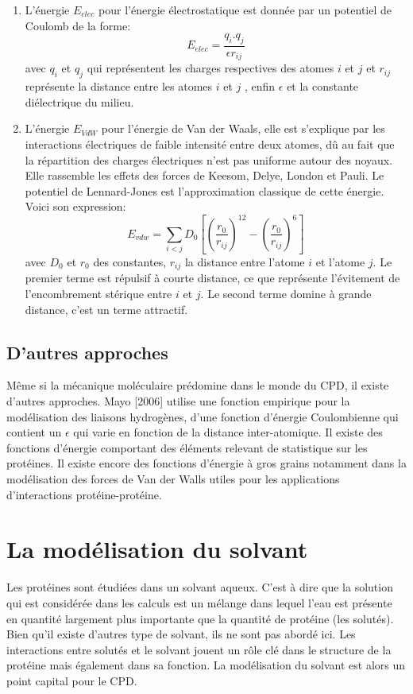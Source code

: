 \begin{enumerate}
  \label{VdW}
\item L'énergie $E_{elec}$ pour l'énergie électrostatique est donnée par un potentiel de Coulomb de la forme:
  \begin{equation}
    E_{elec}=\frac{q_i.q_j}{\epsilon r_{ij}}
  \end{equation}
  avec $q_i$ et $q_j$ qui représentent les charges respectives des atomes $i$ et $j$ et $r_{ij}$ représente la distance entre les atomes $i$ et $j$ , enfin $\epsilon$ et la constante diélectrique du milieu.
\item L'énergie  $E_{VdW}$ pour l'énergie de Van der Waals, elle est s'explique par les interactions électriques de faible intensité entre deux atomes, dû au fait que la répartition des charges électriques n'est pas uniforme autour des noyaux. Elle rassemble les effets des forces de Keesom, Delye, London et Pauli. Le potentiel de Lennard-Jones est l'approximation classique de cette énergie. Voici son expression:
  \begin{equation}
  E_{vdw} = \sum_{i<j}D_0 [(\frac{r_0}{r_{ij}})^12 - (\frac{r_0}{r_{ij}})^6]  
  \end{equation}
avec $D_0$ et $r_0$ des constantes, $r_{ij}$ la distance entre l'atome $i$ et l'atome $j$. Le premier terme est répulsif à courte distance, ce que représente l'évitement de l'encombrement stérique entre $i$ et $j$. Le second terme domine à grande distance, c'est un terme attractif. 
  
\end{enumerate}


\subsection{D'autres approches}

Même si la mécanique moléculaire prédomine dans le monde du CPD, il existe d'autres approches. Mayo [2006] utilise une fonction empirique pour la modélisation des liaisons hydrogènes, d'une fonction d'énergie Coulombienne qui contient un $\epsilon$ qui varie en fonction de la distance inter-atomique. Il existe des fonctions d'énergie comportant des éléments relevant de statistique sur les protéines. Il existe encore des fonctions d'énergie à gros grains notamment dans la modélisation des forces de Van der Walls utiles pour les applications d'interactions protéine-protéine.

\section{La modélisation du solvant}
Les protéines sont étudiées dans un solvant aqueux. C'est à dire que la solution qui est considérée dans les calculs est un mélange dans lequel l'eau est présente en quantité largement plus importante que la quantité de protéine (les solutés). Bien qu'il existe d'autres type de solvant, ils ne sont pas abordé ici. Les interactions entre solutés et le solvant jouent un rôle clé dans le structure de la protéine mais également dans sa fonction. La modélisation du solvant est alors un point capital pour le CPD.


